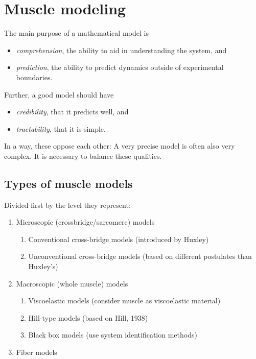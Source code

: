 \section{Muscle modeling}
The main purpose of a mathematical model is
\begin{itemize}
    \item \emph{comprehension}, the ability to aid in understanding the system, and
    \item \emph{prediction}, the ability to predict dynamics outside of experimental boundaries.
\end{itemize}
Further, a good model should have
\begin{itemize}
    \item \emph{credibility}, that it predicts well, and
    \item \emph{tractability}, that it is simple.
\end{itemize}
In a way, these oppose each other: A very precise model is often also very complex. It is necessary to balance these qualities.

\subsection{Types of muscle models}
Divided first by the level they represent:
\begin{enumerate}
    \item Microscopic (crossbridge/sarcomere) models
        \begin{enumerate}
            \item Conventional cross-bridge models (introduced by Huxley)
            \item Unconventional cross-bridge models (based on different postulates than Huxley's)
        \end{enumerate}
    \item Macroscopic (whole muscle) models
        \begin{enumerate}
            \item Viscoelastic models (consider muscle as viscoelastic material)
            \item Hill-type models (based on Hill, 1938)
            \item Black box models (use system identification methods)
        \end{enumerate}
    \item Fiber models
\end{enumerate}

